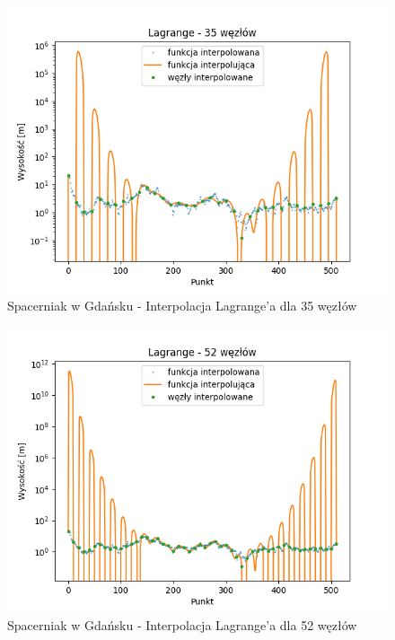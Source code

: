 \documentclass[12pt]{extarticle}
\begin{document}
\begin{figure}[H]
    \centering
    \includegraphics[scale=0.8]{interpolation_SpacerniakGdansk_Lagrange_35.png}
    \caption{Spacerniak w Gdańsku - Interpolacja Lagrange'a dla 35 węzłów}
\end{figure}
\begin{figure}[H]
    \centering
    \includegraphics[scale=0.8]{interpolation_SpacerniakGdansk_Lagrange_52.png}
    \caption{Spacerniak w Gdańsku - Interpolacja Lagrange'a dla 52 węzłów}
\end{figure}
\end{document}
